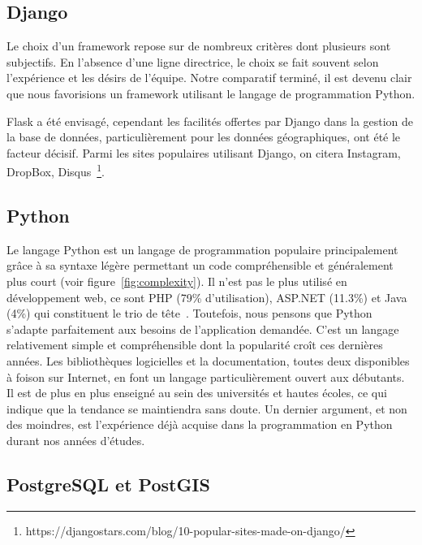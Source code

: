 \documentclass{EPL-master-thesis-covers-FR}
\begin{document}
				\subsection*{Django}

					Le choix d'un framework repose sur de nombreux critères dont plusieurs sont subjectifs. En l'absence d'une ligne directrice, le choix se fait souvent selon l'expérience et les désirs de l'équipe. Notre comparatif terminé, il est devenu clair que nous favorisions un framework utilisant le langage de programmation Python.

					Flask a été envisagé, cependant les facilités offertes par Django dans la gestion de la base de données, particulièrement pour les données géographiques, ont été le facteur décisif. Parmi les sites populaires utilisant Django, on citera Instagram, DropBox, Disqus~\footnote{https://djangostars.com/blog/10-popular-sites-made-on-django/}.

			\subsection*{Python}
				Le langage Python est un langage de programmation populaire principalement grâce à sa syntaxe légère permettant un code compréhensible et généralement plus court (voir figure~\ref{fig:complexity}). Il n'est pas le plus utilisé en développement web, ce sont PHP (79\% d'utilisation), ASP.NET (11.3\%) et Java (4\%) qui constituent le trio de tête~\cite{ref:popular_programming_languages}. Toutefois, nous pensons que Python s'adapte parfaitement aux besoins de l'application demandée. C'est un langage relativement simple et compréhensible dont la popularité croît ces dernières années. Les bibliothèques logicielles et la documentation, toutes deux disponibles à foison sur Internet, en font un langage particulièrement ouvert aux débutants. Il est de plus en plus enseigné au sein des universités et hautes écoles, ce qui indique que la tendance se maintiendra sans doute. Un dernier argument, et non des moindres, est l'expérience déjà acquise dans la programmation en Python durant nos années d'études.

			\subsection*{PostgreSQL et PostGIS}
\end{document}
